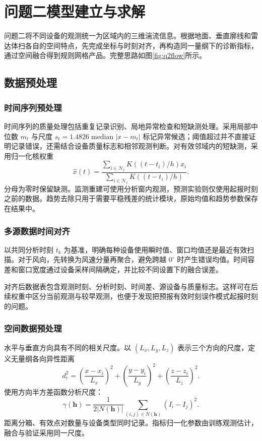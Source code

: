 \clearpage
\section{问题二模型建立与求解}
问题二将不同设备的观测统一为区域内的三维湍流信息。根据地面、垂直廓线和雷达体扫各自的空间特点，先完成坐标与时刻对齐，再构造同一量纲下的诊断指标，通过空间融合得到规则网格产品。完整思路如图\ref{fig:q2flow}所示。
\subsection{数据预处理}
\subsubsection{时间序列预处理}
时间序列的质量处理包括重复记录识别、局地异常检查和短缺测处理。采用局部中位数 $m_t$ 与尺度 $s_t=1.4826\operatorname{median}|x-m_t|$ 标记异常候选；阈值超过并不直接证明记录错误，还需结合设备质量标志和相邻观测判断。对有效邻域内的短缺测，采用归一化核权重
\begin{equation}
\widehat x(t)=\frac{\sum_{i\in\mathcal N_t}K((t-t_i)/h)x_i}
{\sum_{i\in\mathcal N_t}K((t-t_i)/h)}.
\end{equation}
分母为零时保留缺测。监测重建可使用分析窗内观测，预测实验则仅使用起报时刻之前的数据。趋势去除只用于需要平稳残差的统计模块，原始均值和趋势参数保存在结果中。
\subsubsection{多源数据时间对齐}
以共同分析时刻 $t_k$ 为基准，明确每种设备使用瞬时值、窗口均值还是最近有效扫描。对于风向，先转换为风速分量再聚合，避免跨越 $0^\circ$ 时产生错误均值。时间容差和窗口宽度通过设备采样间隔确定，并比较不同设置下的融合误差。

对齐后数据表包含观测时刻、分析时刻、时间差、源设备与质量标志。这样可在后续权重中区分当前观测与较早观测，也便于发现把预报有效时刻误作模式起报时刻的问题。
\subsubsection{空间数据预处理}
水平与垂直方向具有不同的相关尺度。以 $(L_x,L_y,L_z)$ 表示三个方向的尺度，定义无量纲各向异性距离
\begin{equation}
d_i^2=\left(\frac{x-x_i}{L_x}\right)^2+
\left(\frac{y-y_i}{L_y}\right)^2+
\left(\frac{z-z_i}{L_z}\right)^2.
\end{equation}
使用方向半方差函数分析尺度：
\begin{equation}
\gamma(\bm h)=\frac1{2|N(\bm h)|}\sum_{(i,j)\in N(\bm h)}(I_i-I_j)^2.
\end{equation}
距离分箱、有效点对数量与设备类型同时记录。指标归一化参数由训练观测估计，融合与验证采用同一尺度。

